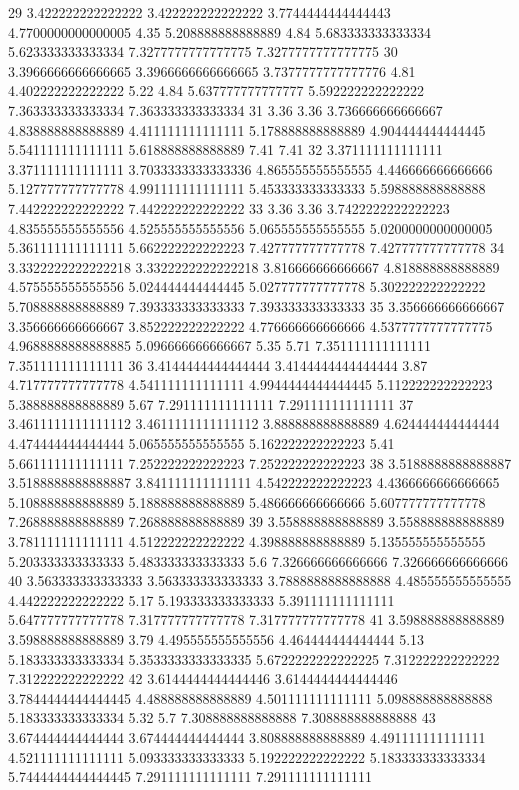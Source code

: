 29 3.422222222222222 3.422222222222222 3.7744444444444443 4.7700000000000005 4.35 5.208888888888889 4.84 5.683333333333334 5.623333333333334 7.3277777777777775 7.3277777777777775
30 3.3966666666666665 3.3966666666666665 3.7377777777777776 4.81 4.402222222222222 5.22 4.84 5.637777777777777 5.592222222222222 7.363333333333334 7.363333333333334
31 3.36 3.36 3.736666666666667 4.838888888888889 4.411111111111111 5.178888888888889 4.904444444444445 5.541111111111111 5.618888888888889 7.41 7.41
32 3.371111111111111 3.371111111111111 3.7033333333333336 4.865555555555555 4.446666666666666 5.127777777777778 4.991111111111111 5.453333333333333 5.598888888888888 7.442222222222222 7.442222222222222
33 3.36 3.36 3.7422222222222223 4.835555555555556 4.525555555555556 5.065555555555555 5.0200000000000005 5.361111111111111 5.662222222222223 7.427777777777778 7.427777777777778
34 3.3322222222222218 3.3322222222222218 3.816666666666667 4.818888888888889 4.575555555555556 5.024444444444445 5.027777777777778 5.302222222222222 5.708888888888889 7.393333333333333 7.393333333333333
35 3.356666666666667 3.356666666666667 3.852222222222222 4.776666666666666 4.5377777777777775 4.9688888888888885 5.096666666666667 5.35 5.71 7.351111111111111 7.351111111111111
36 3.4144444444444444 3.4144444444444444 3.87 4.717777777777778 4.541111111111111 4.9944444444444445 5.112222222222223 5.388888888888889 5.67 7.291111111111111 7.291111111111111
37 3.4611111111111112 3.4611111111111112 3.888888888888889 4.624444444444444 4.474444444444444 5.065555555555555 5.162222222222223 5.41 5.661111111111111 7.252222222222223 7.252222222222223
38 3.5188888888888887 3.5188888888888887 3.841111111111111 4.542222222222223 4.4366666666666665 5.108888888888889 5.188888888888889 5.486666666666666 5.607777777777778 7.268888888888889 7.268888888888889
39 3.558888888888889 3.558888888888889 3.781111111111111 4.512222222222222 4.398888888888889 5.135555555555555 5.203333333333333 5.483333333333333 5.6 7.326666666666666 7.326666666666666
40 3.563333333333333 3.563333333333333 3.7888888888888888 4.485555555555555 4.442222222222222 5.17 5.193333333333333 5.391111111111111 5.647777777777778 7.317777777777778 7.317777777777778
41 3.598888888888889 3.598888888888889 3.79 4.495555555555556 4.464444444444444 5.13 5.183333333333334 5.3533333333333335 5.6722222222222225 7.312222222222222 7.312222222222222
42 3.6144444444444446 3.6144444444444446 3.7844444444444445 4.488888888888889 4.501111111111111 5.098888888888888 5.183333333333334 5.32 5.7 7.308888888888888 7.308888888888888
43 3.674444444444444 3.674444444444444 3.808888888888889 4.491111111111111 4.521111111111111 5.093333333333333 5.192222222222222 5.183333333333334 5.7444444444444445 7.291111111111111 7.291111111111111
